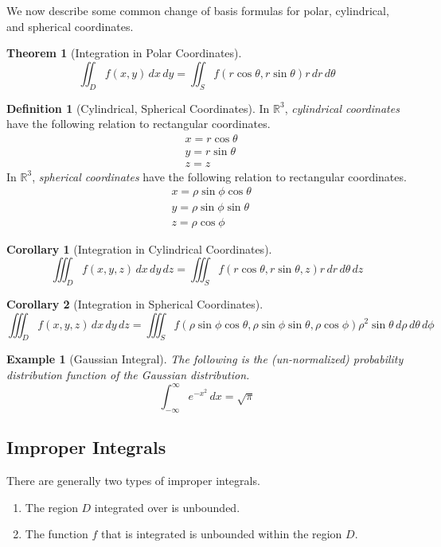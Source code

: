 \documentclass{article}
\newtheorem{theorem}{Theorem}[section]
\newtheorem{example}{Example}[section]
\newtheorem{corollary}{Corollary}[theorem]
\theoremstyle{remark}
\theoremstyle{definition}
\newtheorem{definition}{Definition}[section]
\begin{document}
We now describe some common change of basis formulas for polar, cylindrical, and spherical coordinates. 

\begin{theorem}[Integration in Polar Coordinates]
\[\iint_{D} f(x, y) \, dx \,dy = \iint_S f(r \cos{\theta}, r \sin{\theta}) r \, dr \, d\theta\]
\end{theorem}

\begin{definition}[Cylindrical, Spherical Coordinates]
In $\mathbb{R}^3$, \textit{cylindrical coordinates} have the following relation to rectangular coordinates. 
\begin{align*}
    & x = r \cos{\theta} \\
    & y = r \sin{\theta} \\
    & z = z
\end{align*}
In $\mathbb{R}^3$, \textit{spherical coordinates} have the following relation to rectangular coordinates. 
\begin{align*}
    & x = \rho \sin{\phi} \cos{\theta} \\
    & y = \rho \sin{\phi} \sin{\theta} \\
    & z = \rho \cos{\phi}
\end{align*}
\end{definition}

\begin{corollary}[Integration in Cylindrical Coordinates]
\[\iiint_D f(x, y, z) \, dx \, dy \, dz = \iiint_S f( r \cos{\theta}, r \sin{\theta}, z) r \, dr \, d\theta \, dz\]
\end{corollary}

\begin{corollary}[Integration in Spherical Coordinates]
\[\iiint_D f(x, y, z) \,dx\,dy\,dz = \iiint_S f(\rho \sin{\phi} \cos{\theta}, \rho \sin{\phi} \sin{\theta}, \rho \cos{\phi}) \rho^2 \sin{\theta} \, d\rho \, d\theta \, d\phi\]
\end{corollary}

\begin{example}[Gaussian Integral]
The following is the (un-normalized) probability distribution function of the Gaussian distribution. 
\[\int_{-\infty}^{\infty} e^{-x^2} \, dx = \sqrt{\pi}\]
\end{example}

\subsection{Improper Integrals}
There are generally two types of improper integrals. 
\begin{enumerate}
    \item The region $D$ integrated over is unbounded. 
    \item The function $f$ that is integrated is unbounded within the region $D$.
\end{enumerate}
\end{document}
